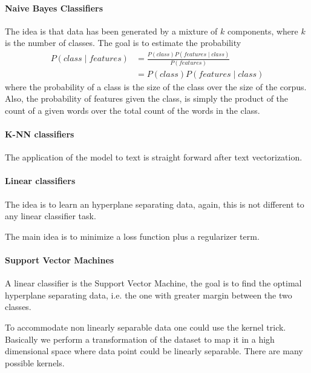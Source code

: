 \paragraph{Naive Bayes Classifiers}
The idea is that data has been generated by a mixture of $k$ components, 
where $k$ is the number of classes.
The goal is to estimate the probability 
\begin{equation}
    \begin{aligned}
        P(\mathit{class} \;|\;\mathit{features} ) &= 
        \frac{P(\mathit{class}) 
        P(\mathit{features}\;|\;\mathit{class})}{P(\mathit{features})}
        \\&= P(\mathit{class}) 
        P(\mathit{features}\;|\;\mathit{class})
    \end{aligned}
\end{equation}
where the probability of a class is the size of the class over the size 
of the corpus.
Also, the probability of features given the class, is simply 
the product of the count of a given words over the total count of the words in 
the class.

\paragraph{K-NN classifiers}
The application of the model to text is straight forward after 
text vectorization.

\paragraph{Linear classifiers}
The idea is to learn an hyperplane separating data, again, this is 
not different to any linear classifier task.

The main idea is to minimize a loss function plus 
a regularizer term.

\paragraph{Support Vector Machines}
A linear classifier is the Support Vector Machine, 
the goal is to find the optimal hyperplane separating data, 
i.e. the one with greater margin between the two classes.

To accommodate non linearly separable data one could use the kernel 
trick. Basically we perform a transformation of the dataset 
to map it in a high dimensional space where data point could be 
linearly separable.  There are many possible kernels.

